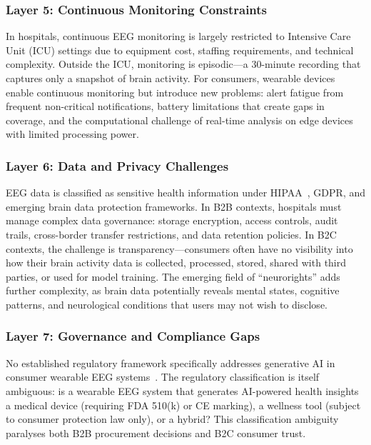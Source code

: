 \subsubsection{Layer 5: Continuous Monitoring Constraints}

In hospitals, continuous EEG monitoring is largely restricted to Intensive Care Unit (ICU) settings due to equipment cost, staffing requirements, and technical complexity. Outside the ICU, monitoring is episodic---a 30-minute recording that captures only a snapshot of brain activity. For consumers, wearable devices enable continuous monitoring but introduce new problems: alert fatigue from frequent non-critical notifications, battery limitations that create gaps in coverage, and the computational challenge of real-time analysis on edge devices with limited processing power.

\subsubsection{Layer 6: Data and Privacy Challenges}

EEG data is classified as sensitive health information under HIPAA~\cite{hipaa1996}, GDPR, and emerging brain data protection frameworks. In B2B contexts, hospitals must manage complex data governance: storage encryption, access controls, audit trails, cross-border transfer restrictions, and data retention policies. In B2C contexts, the challenge is transparency---consumers often have no visibility into how their brain activity data is collected, processed, stored, shared with third parties, or used for model training. The emerging field of ``neurorights'' adds further complexity, as brain data potentially reveals mental states, cognitive patterns, and neurological conditions that users may not wish to disclose.

\subsubsection{Layer 7: Governance and Compliance Gaps}

No established regulatory framework specifically addresses generative AI in consumer wearable EEG systems~\cite{fda2021aiml}. The regulatory classification is itself ambiguous: is a wearable EEG system that generates AI-powered health insights a medical device (requiring FDA 510(k) or CE marking), a wellness tool (subject to consumer protection law only), or a hybrid? This classification ambiguity paralyses both B2B procurement decisions and B2C consumer trust.

